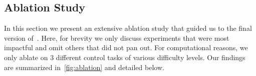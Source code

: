 











\subsection{Ablation Study}
\label{section:ablation}
In this section we present an extensive ablation study that guided us to the final version of~\drqs{}. Here, for brevity we only discuss experiments that were most impactful and omit others that did not pan out. For computational reasons, we only ablate on $3$ different control tasks of various difficulty levels. Our findings are summarized in~\cref{fig:ablation} and detailed below.



